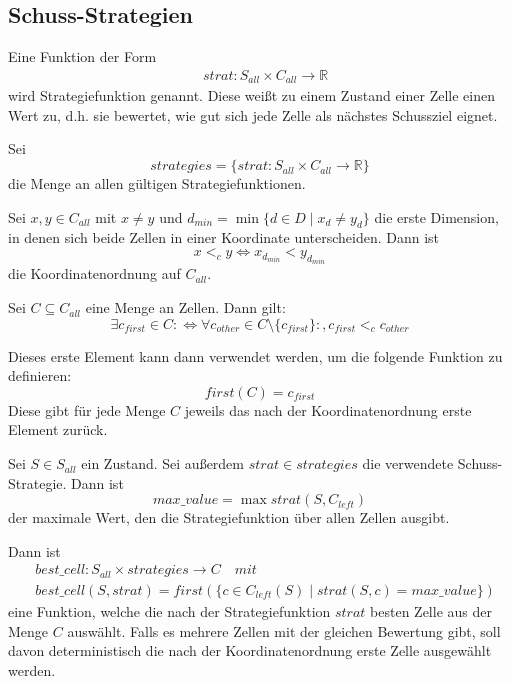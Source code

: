 \documentclass[a4paper,12pt]{llncs}
\numberwithin{equation}{section}
\begin{document}
\subsection{Schuss-Strategien}

\begin{definition}
Eine Funktion der Form
\begin{align}
&strat:S_{all} \times C_{all} \rightarrow \mathbb{R} \nonumber
\end{align}
wird Strategiefunktion genannt. Diese weißt zu einem Zustand einer Zelle einen Wert zu, d.h. sie bewertet, wie gut sich jede Zelle als nächstes Schussziel eignet.
\end{definition}

\begin{definition}
Sei
\[
strategies=\{ strat:S_{all} \times C_{all} \rightarrow \mathbb{R} \}
\]
die Menge an allen gültigen Strategiefunktionen.
\end{definition}

\begin{definition}
Sei $x,y \in C_{all}$ mit $x \neq y$ und $d_{min}=\min \{d \in D \mid x_d \neq y_d\}$ die erste Dimension, in denen sich beide Zellen in einer Koordinate unterscheiden.
Dann ist
\[
x <_c y \Leftrightarrow x_{d_{min}} < y_{d_{min}}
\]
die Koordinatenordnung auf $C_{all}$.
\end{definition}

\begin{definition}
Sei $C \subseteq C_{all}$ eine Menge an Zellen.
Dann gilt:
\[
\exists c_{first} \in C \colon \Leftrightarrow \forall c_{other} \in C \setminus \{c_{first}\} \colon , c_{first} <_c c_{other}
\]

Dieses erste Element kann dann verwendet werden, um die folgende Funktion zu definieren:
\[
first(C)=c_{first}
\]
Diese gibt für jede Menge $C$ jeweils das nach der Koordinatenordnung erste Element zurück.
\end{definition}

\begin{definition}
Sei $S\in S_{all}$ ein Zustand.
Sei außerdem $strat \in strategies$ die verwendete Schuss-Strategie.
Dann ist
\[
max\_value=\max strat(S, C_{left})
\]
der maximale Wert, den die Strategiefunktion über allen Zellen ausgibt.

Dann ist
\begin{align}
&best\_cell:S_{all} \times strategies \rightarrow C \quad mit \nonumber\\
&best\_cell(S, strat)=first(\{c \in C_{left}(S) \mid strat(S, c) = max\_value\})
\nonumber
\end{align}
eine Funktion, welche die nach der Strategiefunktion $strat$ besten Zelle aus der Menge $C$ auswählt.
Falls es mehrere Zellen mit der gleichen Bewertung gibt, soll davon deterministisch die nach der Koordinatenordnung erste Zelle ausgewählt werden.
\end{definition}
\end{document}

